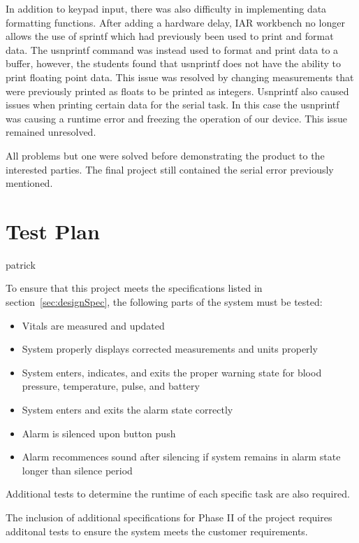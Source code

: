 \documentclass[12pt]{article} %
\begin{document}
    In addition to keypad input, there was also difficulty in implementing data formatting functions. After adding a hardware delay, IAR workbench no longer allows the use of sprintf which had previously been used to print and format data. The usnprintf command was instead used to format and print data to a buffer, however, the students found that usnprintf does not have the ability to print floating point data. This issue was resolved by changing measurements that were previously printed as floats to be printed as integers. Usnprintf also caused issues when printing certain data for the serial task. In this case the usnprintf was causing a runtime error and freezing the operation of our device. This issue remained unresolved. 
    
    
    
    
    All problems but one were solved before demonstrating the product to the interested
    parties. The final project still contained the serial error previously mentioned.
    
    \section{Test Plan} patrick

    To ensure that this project meets the specifications listed in 
    section~\ref{sec:designSpec}, the following parts of the system must be 
    tested: 

    \begin{itemize}
      \item Vitals are measured and updated
      \item System properly displays corrected measurements and units properly
      \item System enters, indicates, and exits the proper warning state for
	blood pressure, temperature, pulse, and battery
      \item System enters and exits the alarm state correctly
      \item Alarm is silenced upon button push
      \item Alarm recommences sound after silencing if system remains in alarm
	state longer than silence period
    \end{itemize}

    Additional tests to determine the runtime of each specific task are also
    required.

    The inclusion of additional specifications for Phase II of the project
    requires additonal tests to ensure the system meets the customer
    requirements.
\end{document}
